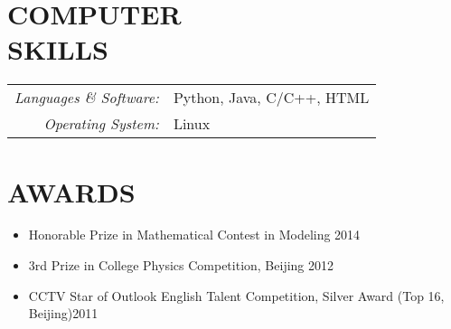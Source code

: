 \documentclass[margin,10pt]{res} %
\begin{document}
\begin{resume}

\section{COMPUTER \\ SKILLS}
\begin{tabular}{rl}
{\sl Languages \& Software:}
& Python, Java, C/C++, HTML \\
{\sl Operating System:}
& Linux\\
\end{tabular}



\section{AWARDS}
\begin{itemize}\itemsep -12pt
    \item Honorable Prize in Mathematical Contest in Modeling {\hfill 2014}\\

    \item 3rd Prize in College Physics Competition, Beijing {\hfill 2012}\\
    \item CCTV Star of Outlook English Talent Competition, Silver Award (Top 16, Beijing){\hfill 2011}
\end{itemize}


\end{resume}
\end{document}
